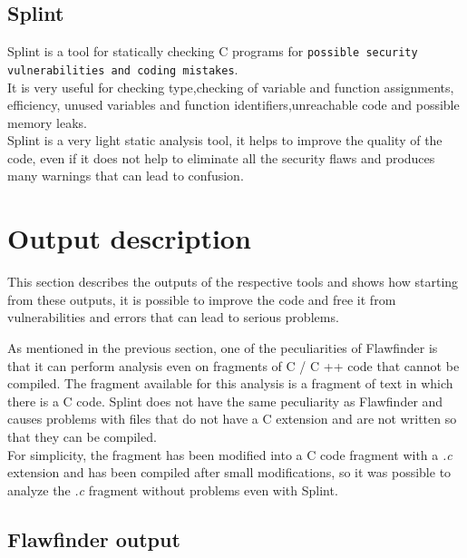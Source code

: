 \documentclass[a4paper,12pt]{article}
\newenvironment{SpecialPar}
  {\begin{shaded}}
  {\end{shaded}}
\begin{document}
\subsection{Splint}
Splint is a tool for statically checking C programs for \texttt{possible security vulnerabilities and coding mistakes}.\cite{splint}\\
It is very useful for checking type,checking of variable and function assignments, efficiency, unused variables and function identifiers,unreachable code and possible memory leaks.\\
Splint is a very light static analysis tool, it helps to improve the quality of the code, even if it does not help to eliminate all the security flaws and produces many warnings that can lead to confusion\cite{splint2}.



\newpage
\section{Output description}
This section describes the outputs of the respective tools and shows how starting from these outputs, it is possible to improve the code and free it from vulnerabilities and errors that can lead to serious problems.
\begin{SpecialPar}
\noindent
As mentioned in the previous section, one of the peculiarities of Flawfinder is that it can perform analysis even on fragments of C / C ++ code that cannot be compiled.
The fragment available for this analysis is a fragment of text in which there is a C code.
Splint does not have the same peculiarity as Flawfinder and causes problems with files that do not have a C extension and are not written so that they can be compiled.\\
For simplicity, the fragment has been modified into a C code fragment with a \textit{.c} extension and has been compiled after small modifications, so it was possible to analyze the \textit{.c} fragment without problems even with Splint.
\end{SpecialPar}


\subsection{Flawfinder output}
\end{document}
